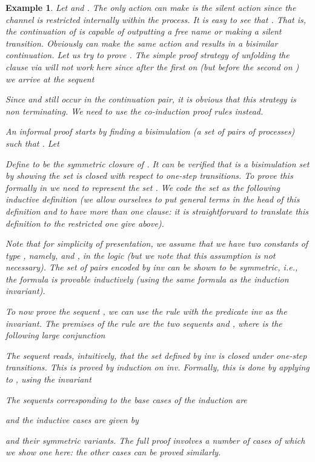 \documentclass{acmtrans2m}
\newenvironment{example}{\begin{exa} \rm}{\end{exa}}
\newtheorem{exa}[theorem]{Example}
\begin{document}
\begin{example}
Let  and .
The only action  can make is the silent action  since
the channel  is restricted internally within the process.
It is easy to see that .
That is, the continuation of  is capable of outputting a free name 
or making a silent transition.
Obviously  can make the same  action and results in 
a bisimilar continuation.
Let us try to prove .
The simple proof strategy of unfolding the
 clause via  will not work here since
after the first  on  
(but before the second  on ) 
we arrive at the sequent 

Since  and  still occur in the continuation pair,
it is obvious that this strategy is non terminating. 
We need to use the co-induction proof rules instead.

An informal proof starts by 
finding a bisimulation (a set of pairs of processes)  such that
. 
Let 

Define  to be the symmetric closure of . 
It can be verified that  is a bisimulation set by showing the set is
closed with respect to one-step transitions. To prove this formally
in  we need to represent the set .
We code the set  as the following inductive definition
(we allow ourselves to put general terms in the head of this
definition and to have more than one clause: it is straightforward to
translate this definition to the restricted one give above).
\newcommand\invar[2]{{\hbox{\sl inv}~#1~#2}}

Note that for simplicity of presentation, we assume that we have two
constants of type , namely,  and , in the logic (but we note that
this assumption is not necessary). 
The set of pairs encoded by {\sl inv} can be shown to be symmetric,
i.e., the formula  is provable
inductively (using the same formula as the induction invariant).

To now prove the sequent , we can use 
the  rule with the predicate {\sl inv} as the invariant.  The
premises of the  rule are the two sequents  and 
, where  is the following
large conjunction

The sequent reads, intuitively, that the set defined by {\sl inv} 
is closed under one-step transitions. This is proved by induction on
{\sl inv}. Formally, this is done by applying  to 
, using the invariant 
 
The sequents corresponding to the base cases of the induction are

and the inductive cases are given by 

and their symmetric variants.
The full proof involves a number of cases of which we show one here:
the other cases can be proved similarly.


\end{example}
\end{document}
